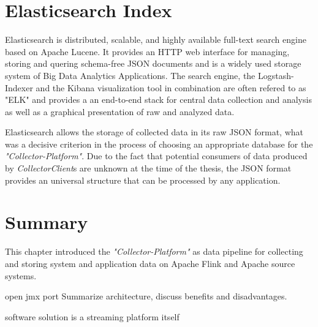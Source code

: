 \section{Elasticsearch Index}

Elasticsearch is distributed, scalable, and highly available full-text search engine based on Apache Lucene.
It provides an HTTP web interface for managing, storing and quering schema-free JSON documents and is a widely used storage system
of Big Data Analytics Applications. The search engine, the Logstash-Indexer and the Kibana visualization tool in combination are
often refered to as "ELK" and provides a an end-to-end stack for central data collection and analysis as well as a graphical
presentation of raw and analyzed data.

Elasticsearch allows the storage of collected data in its raw JSON format, what was a decisive criterion in the process of choosing an
appropriate database for the \textit{"Collector-Platform"}. Due to the fact that potential consumers of data produced by \textit{CollectorClient}s
are unknown at the time of the thesis, the JSON format provides an universal structure that can be processed by any application.

\section{Summary}

This chapter introduced the \textit{"Collector-Platform"} as data pipeline for collecting and storing system and application data
on Apache Flink and Apache source systems.

open jmx port
Summarize architecture, discuss benefits and disadvantages.

software solution is a streaming platform itself